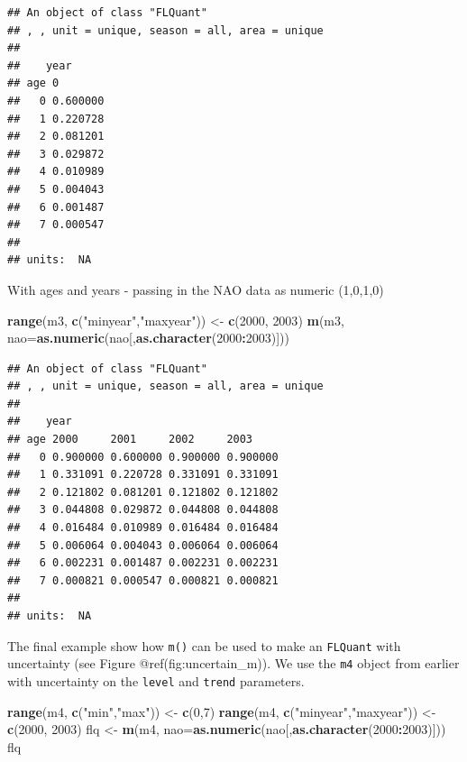 \documentclass[
]{book}
\newenvironment{Shaded}{\begin{snugshade}}{\end{snugshade}}
\newcommand{\AttributeTok}[1]{\textcolor[rgb]{0.13,0.29,0.53}{#1}}
\newcommand{\DecValTok}[1]{\textcolor[rgb]{0.00,0.00,0.81}{#1}}
\newcommand{\FunctionTok}[1]{\textcolor[rgb]{0.13,0.29,0.53}{\textbf{#1}}}
\newcommand{\NormalTok}[1]{#1}
\newcommand{\OtherTok}[1]{\textcolor[rgb]{0.56,0.35,0.01}{#1}}
\newcommand{\SpecialCharTok}[1]{\textcolor[rgb]{0.81,0.36,0.00}{\textbf{#1}}}
\newcommand{\StringTok}[1]{\textcolor[rgb]{0.31,0.60,0.02}{#1}}
\begin{document}
\begin{verbatim}
## An object of class "FLQuant"
## , , unit = unique, season = all, area = unique
## 
##    year
## age 0       
##   0 0.600000
##   1 0.220728
##   2 0.081201
##   3 0.029872
##   4 0.010989
##   5 0.004043
##   6 0.001487
##   7 0.000547
## 
## units:  NA
\end{verbatim}

With ages and years - passing in the NAO data as numeric (1,0,1,0)

\begin{Shaded}
\begin{Highlighting}[]
\FunctionTok{range}\NormalTok{(m3, }\FunctionTok{c}\NormalTok{(}\StringTok{"minyear"}\NormalTok{,}\StringTok{"maxyear"}\NormalTok{)) }\OtherTok{\textless{}{-}} \FunctionTok{c}\NormalTok{(}\DecValTok{2000}\NormalTok{, }\DecValTok{2003}\NormalTok{)}
\FunctionTok{m}\NormalTok{(m3, }\AttributeTok{nao=}\FunctionTok{as.numeric}\NormalTok{(nao[,}\FunctionTok{as.character}\NormalTok{(}\DecValTok{2000}\SpecialCharTok{:}\DecValTok{2003}\NormalTok{)]))}
\end{Highlighting}
\end{Shaded}

\begin{verbatim}
## An object of class "FLQuant"
## , , unit = unique, season = all, area = unique
## 
##    year
## age 2000     2001     2002     2003    
##   0 0.900000 0.600000 0.900000 0.900000
##   1 0.331091 0.220728 0.331091 0.331091
##   2 0.121802 0.081201 0.121802 0.121802
##   3 0.044808 0.029872 0.044808 0.044808
##   4 0.016484 0.010989 0.016484 0.016484
##   5 0.006064 0.004043 0.006064 0.006064
##   6 0.002231 0.001487 0.002231 0.002231
##   7 0.000821 0.000547 0.000821 0.000821
## 
## units:  NA
\end{verbatim}

The final example show how \texttt{m()} can be used to make an \texttt{FLQuant} with uncertainty (see Figure @ref(fig:uncertain\_m)). We use the \texttt{m4} object from earlier with uncertainty on the \texttt{level} and \texttt{trend} parameters.

\begin{Shaded}
\begin{Highlighting}[]
\FunctionTok{range}\NormalTok{(m4, }\FunctionTok{c}\NormalTok{(}\StringTok{"min"}\NormalTok{,}\StringTok{"max"}\NormalTok{)) }\OtherTok{\textless{}{-}} \FunctionTok{c}\NormalTok{(}\DecValTok{0}\NormalTok{,}\DecValTok{7}\NormalTok{)}
\FunctionTok{range}\NormalTok{(m4, }\FunctionTok{c}\NormalTok{(}\StringTok{"minyear"}\NormalTok{,}\StringTok{"maxyear"}\NormalTok{)) }\OtherTok{\textless{}{-}} \FunctionTok{c}\NormalTok{(}\DecValTok{2000}\NormalTok{, }\DecValTok{2003}\NormalTok{)}
\NormalTok{flq }\OtherTok{\textless{}{-}} \FunctionTok{m}\NormalTok{(m4, }\AttributeTok{nao=}\FunctionTok{as.numeric}\NormalTok{(nao[,}\FunctionTok{as.character}\NormalTok{(}\DecValTok{2000}\SpecialCharTok{:}\DecValTok{2003}\NormalTok{)]))}
\NormalTok{flq}
\end{Highlighting}
\end{Shaded}
\end{document}
